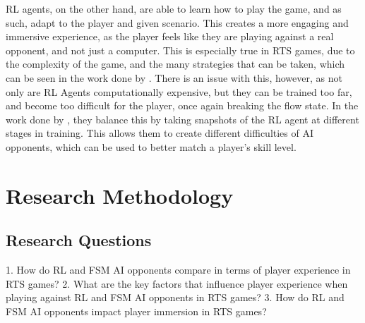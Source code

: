 \documentclass[conference]{IEEEtran}
\begin{document}
RL agents, on the other hand, are able to learn how to play the game, and as such, adapt to the player and given scenario. This creates a more engaging
and immersive experience, as the player feels like they are playing against a real opponent, and not just a computer. This is especially true in RTS games,
due to the complexity of the game, and the many strategies that can be taken, which can be seen in the work done by \cite{vinyals_grandmaster_2019}.
There is an issue with this, however, as not only are RL Agents computationally expensive, but they can be trained too far, and become too difficult for the player,
once again breaking the flow state. In the work done by \cite{grech_creating_2023}, they balance this by taking snapshots of the RL agent at different
stages in training. This allows them to create different difficulties of AI opponents, which can be used to better match a player's skill level.




\section{Research Methodology}

\subsection{Research Questions}

1. How do RL and FSM AI opponents compare in terms of player experience in RTS games?
2. What are the key factors that influence player experience when playing against RL and FSM AI opponents in RTS games?
3. How do RL and FSM AI opponents impact player immersion in RTS games?
\end{document}
